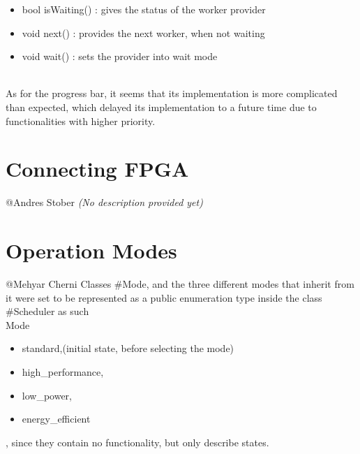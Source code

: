 \documentclass[parskip=full]{scrartcl}
\newcommand\tab[1][1cm]{\hspace*{#1}}
\begin{document}
	\begin {itemize}
		\item bool isWaiting() : gives the status of the worker provider
		\item void next() : provides the next worker, when not waiting
		\item void wait() : sets the provider into wait mode
	\end{itemize}
\\As for the progress bar, it seems that its implementation is more complicated than expected, which delayed its implementation to a future time due to functionalities with higher priority.
	
	
\pagebreak

\section{Connecting FPGA} \label{Connecting FPGA}
	@Andres Stober \textit{(No description provided yet)}
	

\pagebreak



\pagebreak

\section{Operation Modes} \label{Operation Modes}
	@Mehyar Cherni
	\tab Classes #Mode, and the three different modes that inherit from it were set to be represented as a public enumeration type inside the class #Scheduler as such \\ Mode {
	\begin {itemize}
		\item standard,(initial state, before selecting the mode)
		\item high_performance, 
		\item low_power,
		\item energy_efficient
	\end{itemize}  
	} , since they contain no functionality, but only describe states.


\pagebreak
\end{document}
